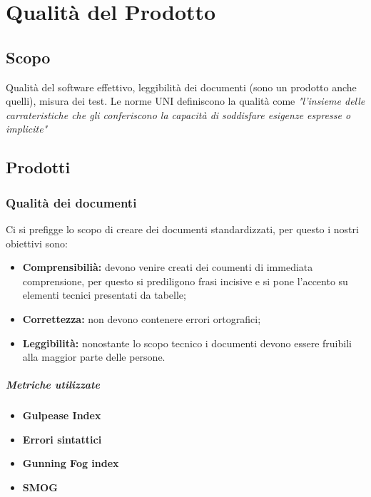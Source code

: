 \section{Qualità del Prodotto}
\subsection{Scopo}
Qualità del software effettivo, leggibilità dei documenti (sono un prodotto anche quelli), misura dei test.
Le norme UNI definiscono la qualità come \textit{"l'insieme delle carrateristiche che gli conferiscono la capacità di soddisfare esigenze espresse o implicite"}
\subsection{Prodotti}
\subsubsection{Qualità dei documenti}
Ci si prefigge lo scopo di creare dei documenti standardizzati, per questo i nostri obiettivi sono:
\begin{itemize}
	\item{\textbf{Comprensibilià:} devono venire creati dei coumenti di immediata comprensione, per questo si prediligono frasi incisive e si pone l'accento su elementi tecnici presentati da tabelle;}
	\item{\textbf{Correttezza:} non devono contenere errori ortografici;}
	\item{\textbf{Leggibilità:} nonostante lo scopo tecnico i documenti devono essere fruibili alla maggior parte delle persone.}
\end{itemize}
\vspace{0.8cm}
\subparagraph{Metriche utilizzate}
\begin{itemize}
	\item{\textbf{Gulpease Index}}
	\item{\textbf{Errori sintattici}}
	\item{\textbf{Gunning Fog index}}
	\item{\textbf{SMOG}}
\end{itemize}
\begin{table}[!htpb]
	\centering
	\renewcommand{\arraystretch}{2} 
	\caption{TBD}
\end{table}
